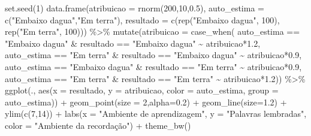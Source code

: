 \documentclass[
]{book}
\newenvironment{Shaded}{\begin{snugshade}}{\end{snugshade}}
\newcommand{\AttributeTok}[1]{\textcolor[rgb]{0.77,0.63,0.00}{#1}}
\newcommand{\DecValTok}[1]{\textcolor[rgb]{0.00,0.00,0.81}{#1}}
\newcommand{\FloatTok}[1]{\textcolor[rgb]{0.00,0.00,0.81}{#1}}
\newcommand{\FunctionTok}[1]{\textcolor[rgb]{0.00,0.00,0.00}{#1}}
\newcommand{\NormalTok}[1]{#1}
\newcommand{\SpecialCharTok}[1]{\textcolor[rgb]{0.00,0.00,0.00}{#1}}
\newcommand{\StringTok}[1]{\textcolor[rgb]{0.31,0.60,0.02}{#1}}
\begin{document}
\begin{Shaded}
\begin{Highlighting}[]
\FunctionTok{set.seed}\NormalTok{(}\DecValTok{1}\NormalTok{)}
\FunctionTok{data.frame}\NormalTok{(}\AttributeTok{atribuicao =} \FunctionTok{rnorm}\NormalTok{(}\DecValTok{200}\NormalTok{,}\DecValTok{10}\NormalTok{,}\FloatTok{0.5}\NormalTok{), }
           \AttributeTok{auto\_estima =} \FunctionTok{c}\NormalTok{(}\StringTok{"Embaixo d\textquotesingle{}agua"}\NormalTok{,}\StringTok{"Em terra"}\NormalTok{),}
           \AttributeTok{resultado =} \FunctionTok{c}\NormalTok{(}\FunctionTok{rep}\NormalTok{(}\StringTok{"Embaixo d\textquotesingle{}agua"}\NormalTok{, }\DecValTok{100}\NormalTok{), }
                         \FunctionTok{rep}\NormalTok{(}\StringTok{"Em terra"}\NormalTok{, }\DecValTok{100}\NormalTok{))) }\SpecialCharTok{\%\textgreater{}\%}
  \FunctionTok{mutate}\NormalTok{(}\AttributeTok{atribuicao =} \FunctionTok{case\_when}\NormalTok{(}
\NormalTok{    auto\_estima }\SpecialCharTok{==} \StringTok{"Embaixo d\textquotesingle{}agua"} \SpecialCharTok{\&} 
\NormalTok{      resultado }\SpecialCharTok{==} \StringTok{"Embaixo d\textquotesingle{}agua"} \SpecialCharTok{\textasciitilde{}}\NormalTok{ atribuicao}\SpecialCharTok{*}\FloatTok{1.2}\NormalTok{,}
\NormalTok{    auto\_estima }\SpecialCharTok{==} \StringTok{"Em terra"} \SpecialCharTok{\&} 
\NormalTok{      resultado }\SpecialCharTok{==} \StringTok{"Embaixo d\textquotesingle{}agua"} \SpecialCharTok{\textasciitilde{}} 
\NormalTok{      atribuicao}\SpecialCharTok{*}\FloatTok{0.9}\NormalTok{,}
\NormalTok{    auto\_estima }\SpecialCharTok{==} \StringTok{"Embaixo d\textquotesingle{}agua"} \SpecialCharTok{\&} 
\NormalTok{      resultado }\SpecialCharTok{==} \StringTok{"Em terra"} \SpecialCharTok{\textasciitilde{}}\NormalTok{ atribuicao}\SpecialCharTok{*}\FloatTok{0.9}\NormalTok{,}
\NormalTok{     auto\_estima }\SpecialCharTok{==} \StringTok{"Em terra"} \SpecialCharTok{\&} 
\NormalTok{      resultado }\SpecialCharTok{==} \StringTok{"Em terra"} \SpecialCharTok{\textasciitilde{}}\NormalTok{ atribuicao}\SpecialCharTok{*}\FloatTok{1.2}\NormalTok{)) }\SpecialCharTok{\%\textgreater{}\%} 
  \FunctionTok{ggplot}\NormalTok{(., }\FunctionTok{aes}\NormalTok{(}\AttributeTok{x =}\NormalTok{ resultado, }\AttributeTok{y =}\NormalTok{ atribuicao, }
                \AttributeTok{color =}\NormalTok{ auto\_estima, }\AttributeTok{group =}\NormalTok{ auto\_estima)) }\SpecialCharTok{+} 
  \FunctionTok{geom\_point}\NormalTok{(}\AttributeTok{size =} \DecValTok{2}\NormalTok{,}\AttributeTok{alpha=}\FloatTok{0.2}\NormalTok{) }\SpecialCharTok{+}
  \FunctionTok{geom\_line}\NormalTok{(}\AttributeTok{size=}\FloatTok{1.2}\NormalTok{) }\SpecialCharTok{+}
  \FunctionTok{ylim}\NormalTok{(}\FunctionTok{c}\NormalTok{(}\DecValTok{7}\NormalTok{,}\DecValTok{14}\NormalTok{)) }\SpecialCharTok{+}
  \FunctionTok{labs}\NormalTok{(}\AttributeTok{x =} \StringTok{"Ambiente de aprendizagem"}\NormalTok{, }
       \AttributeTok{y =} \StringTok{"Palavras lembradas"}\NormalTok{, }
       \AttributeTok{color =} \StringTok{"Ambiente da recordação"}\NormalTok{) }\SpecialCharTok{+}
  \FunctionTok{theme\_bw}\NormalTok{()}
\end{Highlighting}
\end{Shaded}
\end{document}
